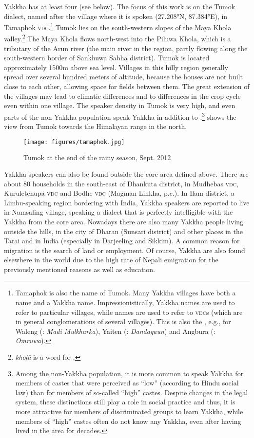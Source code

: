 Yakkha has at least four  (see  below). The focus of this work is on the Tumok dialect, named after the village where it is spoken (27.208°N, 87.384°E), in Tamaphok \textsc{vdc}.\footnote{Tamaphok is also the  name of Tumok. Many Yakkha villages have both a  name and a Yakkha name. Impressionistically, Yakkha names are used to refer to particular villages, while   names are used to refer  to \textsc{vdc}s (which are in general conglomerations of several villages). This is also the , e.g., for Waleng (: \emph{Madi Mulkharka}), Yaiten (: \emph{Dandagaun}) and Angbura (: \emph{Omruwa}).} Tumok  lies on the south-western slopes of the Maya Khola valley.\footnote{\emph{kholā} is a  word for .} The Maya Khola flows north-west into the Piluwa Khola, which is a tributary of the Arun river (the main river in the region, partly flowing along the south-western border of Sankhuwa Sabha district). Tumok  is located approximately 1500m above sea level. Villages in this hilly region generally spread over several hundred meters of altitude, because the houses are not built close to each other, allowing space for fields between them. The great extension of the villages may lead to climatic differences and to differences in the crop cycle even within one village. The speaker density in Tumok is very high, and even parts of the non-Yakkha population speak Yakkha in addition to .\footnote{Among the non-Yakkha population, it is more common to speak Yakkha for members of castes that were perceived as “low” (according to Hindu social law)  than for members of so-called “high” castes. Despite changes in the legal system, these distinctions still play a role in social practice and thus, it is more attractive for members of discriminated groups to learn Yakkha, while members of “high” castes often do not know any Yakkha, even after having lived in the area for decades.}  shows the view from Tumok towards the Himalayan range in the north. 

\begin{figure}
\centering
\texttt{[image: figures/tamaphok.jpg]}
\caption{Tumok at the end of the rainy season, Sept. 2012}\label{tumok}
\end{figure}
 

Yakkha speakers can also be found outside the core area defined above. There are about 80 households in the south-east of Dhankuta district, in Mudhebas \textsc{vdc}, Kuruletenupa \textsc{vdc} and Bodhe \textsc{vdc} (Magman Linkha, p.c.). In Ilam district, a Limbu-speaking region bordering with India, Yakkha speakers are reported to live in Namsaling village, speaking a dialect that is perfectly intelligible with the Yakkha from the core area. Nowadays there are also many Yakkha people living outside the hills, in the city of Dharan (Sunsari district) and other places in the Tarai and in India (especially in Darjeeling and Sikkim). A common reason for migration is the search of land or employment. Of course, Yakkha are also found elsewhere in the world due to the high rate of Nepali emigration for the previously mentioned reasons as well as education. 

